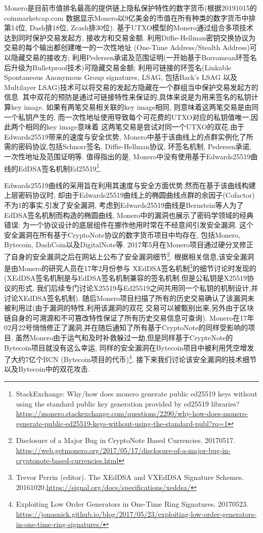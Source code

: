 \documentclass{article}
\begin{document}
Monero是目前市值排名最高的提供链上隐私保护特性的数字货币(根据20191015的coinmarketcap.com
数据显示Monero以9亿美金的市值在所有种类的数字货币中排第14位, Dash排18位, Zcash排30位).
基于UTXO模型的Monero通过组合多项技术达到同时保护交易发起方, 接收方和交易金额. 
利用Diffie-Hellman密钥交换协议为交易的每个输出都创建唯一的一次性地址
(One-Time Address/Stealth Address)可以隐藏交易的接收方; 
利用Pedersen承诺及范围证明(一开始基于Borromean环签名后升级为Bulletproof技术)可隐藏交易金额;
利用可链接的环签名(Linkable Spontaneous Anonymous Group signatures, LSAG, 包括Back's LSAG
以及Multilayer LSAG)技术可以将交易的发起方隐藏在一个群组当中保护交易发起方的信息.
其中双花的预防是通过可链接特性来保证的,具体来说是为用来签名的私钥计算key image.
如果有两笔交易相关联的key image相同, 则意味着这两笔交易是由同一个私钥产生的,
而一次性地址使用导致每个可花费的UTXO对应的私钥值唯一,因此两个相同的key image意味着
这两笔交易是尝试对同一个UTXO的双花.由于Edwards25519带来的速度与安全优势, 
Monero中基于该曲线上的点群实例化了所需的密码协议,包括Schnorr签名, Diffie-Hellman协议,
环签名机制, Pedersen承诺, 一次性地址及范围证明等.
值得指出的是, Monero中没有使用基于Edwards25519曲线的EdDSA签名机制Ed25519\footnote{
StackExchange: Why/how does monero generate public ed25519 keys without using the standard public key generation provided by ed25519 libraries?
\url{https://monero.stackexchange.com/questions/2290/why-how-does-monero-generate-public-ed25519-keys-without-using-the-standard-publ?rq=1}}.

Edwards25519曲线的采用旨在利用其速度与安全方面优势,然而在基于该曲线构建上层密码协议时,
却由于Edwards25519曲线上的椭圆曲线点群的余因子(Cofactor)不为1的事实,引发了安全漏洞, 
考虑到Edwards25519曲线是Bernstein等人为了EdDSA签名机制而构造的椭圆曲线,
Monero中的漏洞也展示了密码学领域的经典错误:
为一个协议设计的底层组件在挪作他用时常在不经意间引发安全漏洞.
这个安全漏洞在所有基于CryptoNote协议的数字货币项目中均存在,
包括Monero, Bytecoin, DashCoin以及DigitalNote等. 
2017年5月在Monero项目通过硬分叉修正了自身的安全漏洞之后在网站上公布了安全漏洞细节\footnote{
Disclosure of a Major Bug in CryptoNote Based Currencies. 20170517.
\url{https://web.getmonero.org/2017/05/17/disclosure-of-a-major-bug-in-cryptonote-based-currencies.html}}. 根据相关信息,该安全漏洞是由Monero的研究人员在17年2月份参与
XEdDSA签名机制\footnote{Trevor Perrin (editor). The XEdDSA and VXEdDSA Signature Schemes. 20161020.\url{https://signal.org/docs/specifications/xeddsa/}}的细节讨论时发现的
(XEdDSA签名机制是与EdDSA签名机制兼容的签名机制,但是公私钥是X25519协议的形式, 
我们后续专门讨论X25519与Ed25519之间共用同一个私钥的机制设计,并讨论XEdDSA签名机制).
随后Monero项目扫描了所有的历史交易确认了该漏洞未被利用过(由于漏洞的特性,利用该漏洞的双花
交易可以被甄别出来,另外由于区块链自身的可溯源和不可篡改特性保证了所有历史交易信息可查询).
Monero在17年02月22号悄悄修正了漏洞,并在随后通知了所有基于CryptoNote的同样受影响的项目,
虽然Monero由于运气和及时补救躲过一劫,但是同样基于CrypteNote的Bytecoin项目就没有这么幸运,
同样的安全漏洞在Bytecoin项目中被利用凭空增发了大约7亿个BCN (Bytecoin项目的代币)\footnote{
Exploiting Low Order Generators in One-Time Ring Signatures. 20170523.
\url{https://jonasnick.github.io/blog/2017/05/23/exploiting-low-order-generators-in-one-time-ring-signatures/}}.
接下来我们讨论该安全漏洞的技术细节以及Bytecoin中的双花攻击.
\end{document}
